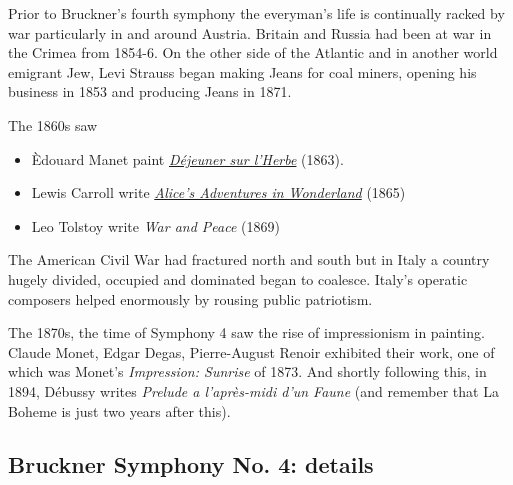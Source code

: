 Prior to Bruckner's fourth symphony the everyman's life is continually racked by war particularly in and around Austria. Britain and Russia had been at war in the Crimea from 1854-6. On the other side of the Atlantic and in another world emigrant Jew, Levi Strauss began making Jeans for coal miners, opening his business in 1853 and producing Jeans in 1871.  

The 1860s saw 
\begin{itemize}
\item \`Edouard Manet paint \textit{\href{https://www.khanacademy.org/humanities/becoming-modern/avant-garde-france/realism/v/manet-le-d-jeuner-sur-l-herbe-luncheon-on-the-grass-1863}{D\'ejeuner sur l'Herbe}} (1863).
\item Lewis Carroll write \textit{\href{http://www.gutenberg.org/files/11/11-h/11-h.htm}{Alice's Adventures in Wonderland}} (1865)
\item Leo Tolstoy write \textit{War and Peace} (1869)
\end{itemize}

The American Civil War had fractured north and south but in Italy a country hugely divided, occupied and dominated began to coalesce. Italy's operatic composers helped enormously by rousing public patriotism.

The 1870s, the time of Symphony 4 saw the rise of impressionism in painting. Claude Monet, Edgar Degas, Pierre-August Renoir exhibited their work, one of which was Monet's \textit{Impression: Sunrise} of 1873. 
And shortly following this, in 1894, D\'ebussy writes \textit{Prelude a l'apr\`es-midi d'un Faune} (and remember that La Boheme is just two years after this). 

\subsection{Bruckner Symphony No. 4: details} 













